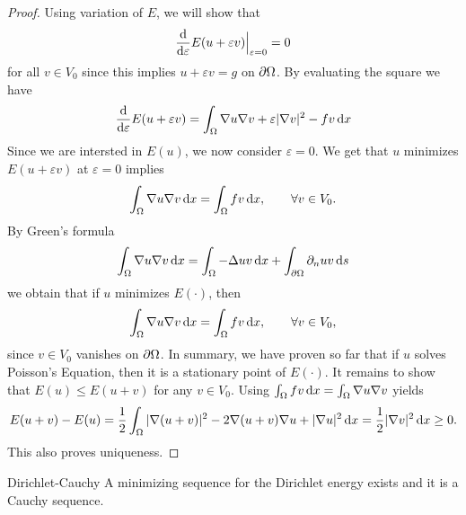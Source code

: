 \begin{proof}
  Using variation of $E$, we will show that
  \begin{gather*}
    \frac{\mathrm{d}}{\mathrm{d} \varepsilon} E(u+\varepsilon v)
    \Big|_{\varepsilon=0} = 0
  \end{gather*}
  for all $v \in V_0$ since this implies $u + \varepsilon v = g$
  on $\partial\Omega$. By evaluating the square we have
  \begin{gather*}
    \frac{\mathrm{d}}{\mathrm{d} \varepsilon} E(u+\varepsilon v)
    = \int_\Omega \nabla u \nabla v + \varepsilon \lvert\nabla v\rvert^2 - fv \,\mathrm{d} x
  \end{gather*}
  Since we are intersted in $E(u)$, we now consider $\varepsilon=0$. We
  get that $u$ minimizes $E(u+\varepsilon v)$ at $\varepsilon = 0$ implies
  \begin{gather*}
    \int_\Omega \nabla u \nabla v \,\mathrm{d} x = \int_\Omega fv \,\mathrm{d} x,
    \qquad\forall v\in V_0.
  \end{gather*}
  By Green's formula
  \begin{gather*}
    \int_\Omega \nabla u \nabla v \,\mathrm{d} x = \int_\Omega - \Delta u v \,\mathrm{d} x
    + \int_{\partial\Omega} \partial_n u v \,\mathrm{d} s
  \end{gather*}
  we obtain that if $u$ minimizes $E(\cdot)$, then
  \begin{gather*}
    \int_\Omega \nabla u \nabla v \,\mathrm{d} x = \int_\Omega fv \,\mathrm{d} x,
    \qquad\forall v\in V_0,
  \end{gather*}
  since $v \in V_0$ vanishes on $\partial\Omega$. In summary, we have
  proven so far that if $u$ solves Poisson's Equation, then it is a
  stationary point of $E(\cdot)$. It remains to show that
  $E(u) \le E(u+v)$ for any $v\in V_0$.  Using
  $\int_\Omega fv \,\mathrm{d} x = \int_\Omega \nabla u \nabla v$ yields
  \begin{multline*}
    E(u+v) - E(u) = \frac 12 \int_\Omega |\nabla (u+v)|^2 - 2 \nabla (u+v) \nabla u
    + |\nabla u|^2 \,\mathrm{d} x
    = \frac 12 |\nabla v|^2 \,\mathrm{d} x \ge 0.
  \end{multline*}
  This also proves uniqueness.
\end{proof}

\begin{Lemma}{Dirichlet-Cauchy}
  A minimizing sequence for the Dirichlet energy exists and it is a
  Cauchy sequence.
\end{Lemma}

